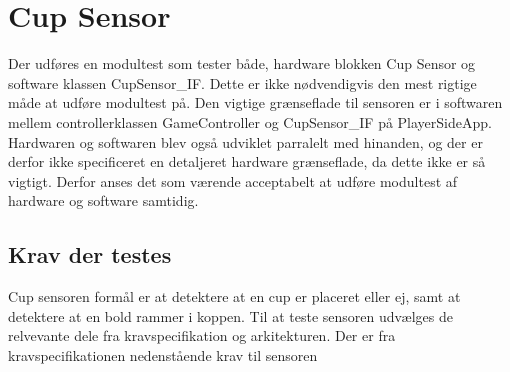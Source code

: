\documentclass[Modultest/Modultest_main.tex]{subfiles}
\begin{document}
\section{Cup Sensor}
Der udføres en modultest som tester både, hardware blokken Cup Sensor og software klassen CupSensor\_IF. Dette er ikke nødvendigvis den mest rigtige måde at udføre modultest på. Den vigtige grænseflade til sensoren er i softwaren mellem controllerklassen GameController og CupSensor\_IF på PlayerSideApp. Hardwaren og softwaren blev også udviklet parralelt med hinanden, og der er derfor ikke specificeret en detaljeret hardware grænseflade, da dette ikke er så vigtigt. Derfor anses det som værende acceptabelt at udføre modultest af hardware og software samtidig.

\subsection{Krav der testes}
Cup sensoren formål er at detektere at en cup er placeret eller ej, samt at detektere at en bold rammer i koppen. Til at teste sensoren udvælges de relvevante dele fra kravspecifikation og arkitekturen. Der er fra kravspecifikationen nedenstående krav til sensoren
\end{document}
